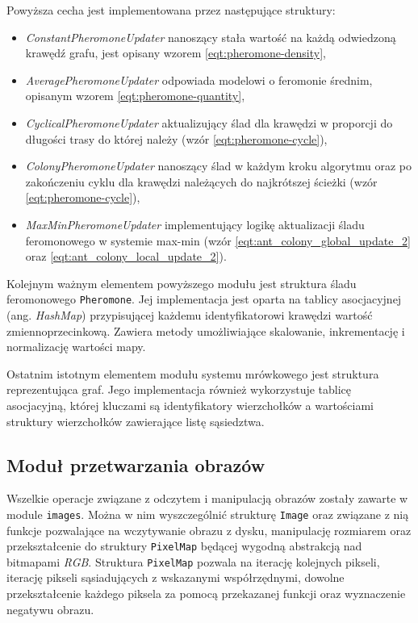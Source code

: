 {{{            Powyższa cecha jest implementowana przez następujące struktury:

            \begin{itemize}
                \item \textit{ConstantPheromoneUpdater} nanoszący stała wartość na każdą odwiedzoną krawędź grafu, jest
                opisany wzorem \ref{eqt:pheromone-density},
                \item \textit{AveragePheromoneUpdater} odpowiada modelowi o feromonie średnim, opisanym wzorem \ref{eqt:pheromone-quantity},
                \item \textit{CyclicalPheromoneUpdater} aktualizujący ślad dla krawędzi w proporcji do długości trasy do
                której należy (wzór \ref{eqt:pheromone-cycle}),
                \item \textit{ColonyPheromoneUpdater} nanoszący ślad w każdym kroku algorytmu oraz po zakończeniu cyklu
                dla krawędzi należących do najkrótszej ścieżki (wzór \ref{eqt:pheromone-cycle}),
                \item \textit{MaxMinPheromoneUpdater} implementujący logikę aktualizacji śladu feromonowego w systemie
                max-min (wzór \ref{eqt:ant_colony_global_update_2} oraz \ref{eqt:ant_colony_local_update_2}).
            \end{itemize}

            Kolejnym ważnym elementem powyższego modułu jest struktura śladu feromonowego \texttt{Pheromone}. Jej
            implementacja jest oparta na tablicy asocjacyjnej (ang. \textit{HashMap}) przypisującej każdemu
            identyfikatorowi krawędzi wartość zmiennoprzecinkową. Zawiera metody umożliwiające skalowanie,
            inkrementację i normalizację wartości mapy.

            Ostatnim istotnym elementem modułu systemu mrówkowego jest struktura reprezentująca graf. Jego implementacja
            również wykorzystuje tablicę asocjacyjną, której kluczami są identyfikatory wierzchołków a wartościami
            struktury wierzchołków zawierające listę sąsiedztwa.
        }

        \subsection{Moduł przetwarzania obrazów}
        {
            Wszelkie operacje związane z odczytem i manipulacją obrazów zostały zawarte w module \texttt{images}. Można
            w nim wyszczególnić strukturę \texttt{Image} oraz związane z nią funkcje pozwalające na wczytywanie obrazu z
            dysku, manipulację rozmiarem oraz przekształcenie do struktury \texttt{PixelMap} będącej wygodną abstrakcją
            nad bitmapami \textit{RGB}. Struktura \texttt{PixelMap} pozwala na iterację kolejnych pikseli, iterację
            pikseli sąsiadujących z wskazanymi współrzędnymi, dowolne przekształcenie każdego piksela za pomocą
            przekazanej funkcji oraz wyznaczenie negatywu obrazu.

}}}
